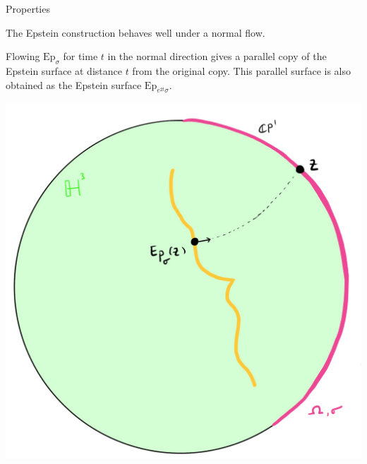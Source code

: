 \documentclass[professionalfont]{beamer}
\begin{document}
\begin{frame}{Properties}

The Epstein construction behaves well under a normal flow. 

Flowing $\mathrm{Ep}_\sigma$ for time $t$ in the normal direction gives a parallel copy of the Epstein surface at distance $t$ from the original copy. This parallel surface is also obtained as the Epstein surface $\mathrm{Ep}_{e^{2t}\sigma}$.

\centering\includegraphics[scale=0.09]{Parallel-5.jpg}

\end{frame}


\end{document}
